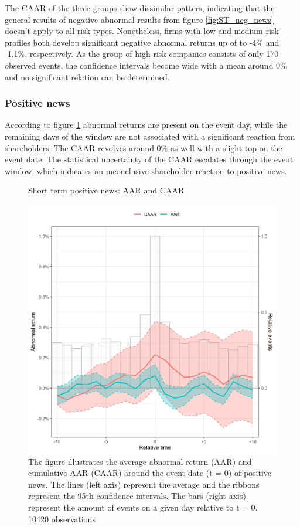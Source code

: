 The CAAR of the three groups show dissimilar patters, indicating that the general results of negative abnormal results from figure \ref{fig:ST_neg_news} doesn't apply to all risk types. Nonetheless, firms with low and medium risk profiles both develop significant negative abnormal returns up of to -4\% and -1.1\%, respectively. As the group of high risk companies consists of only 170 observed events, the confidence intervals become wide with a mean around 0\% and no significant relation can be determined. 



\subsubsection{Positive news}

According to figure \ref{fig:ST_pos_news} abnormal returns are present on the event day, while the remaining days of the window are not associated with a significant reaction from shareholders. The CAAR revolves around 0\% as well with a slight top on the event date. The statistical uncertainty of the CAAR escalates through the event window, which indicates an inconclusive shareholder reaction to positive news.    

\begin{figure} [H] 
    \centering
    \caption{Short term positive news: AAR and CAAR}
    \includegraphics[scale=0.6]{Projekt/1.Figures analysis/ST_positive_all_CI.png}
    \caption*{\footnotesize The figure illustrates the average abnormal return (AAR) and cumulative AAR (CAAR) around the event date (t = 0) of positive news. The lines (left axis) represent the average and the ribbons represent the 95th confidence intervals. The bars (right axis) represent the amount of events on a given day relative to t = 0. 10420  observations}
    \label{fig:ST_pos_news}
\end{figure}

